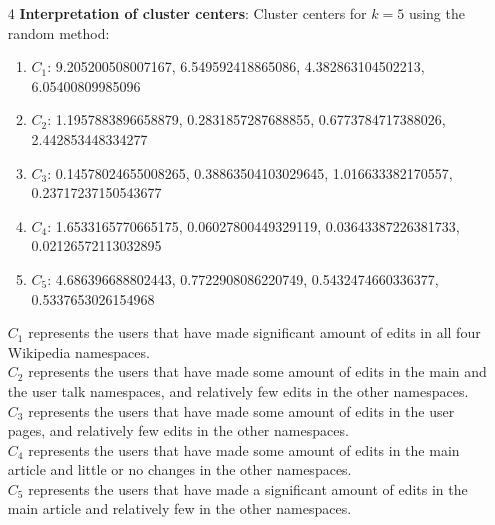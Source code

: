 \documentclass[12pt]{article}
\begin{document}
\begin{enumerate}
    \item[4] \textbf{Interpretation of cluster centers}:
      Cluster centers for $k=5$ using the random method:
      \begin{enumerate}
        \item $C_1$: 9.205200508007167, 6.549592418865086, 4.382863104502213, 6.05400809985096
        \item $C_2$: 1.1957883896658879, 0.2831857287688855, 0.6773784717388026, 2.442853448334277
        \item $C_3$: 0.14578024655008265, 0.38863504103029645, 1.016633382170557, 0.23717237150543677
        \item $C_4$: 1.6533165770665175, 0.06027800449329119, 0.03643387226381733, 0.02126572113032895
        \item $C_5$: 4.686396688802443, 0.7722908086220749, 0.5432474660336377, 0.5337653026154968
          \end{enumerate}
          $C_1$ represents the users that have made significant amount of edits in all four Wikipedia namespaces.\\
          $C_2$ represents the users that have made some amount of edits in the main and the user talk namespaces, and relatively few edits in the other namespaces.\\
          $C_3$ represents the users that have made some amount of edits in the user pages, and relatively few edits in the other namespaces.\\
          $C_4$ represents the users that have made some amount of edits in the main article and little or no changes in the other namespaces.\\
          $C_5$ represents the users that have made a significant amount of edits in the main article and relatively few in the other namespaces.

    
  \end{enumerate}
\end{document}
